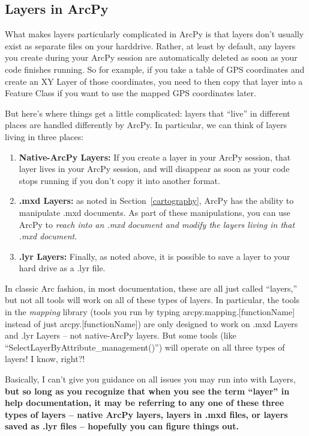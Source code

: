 \documentclass[12pt]{article}
\begin{document}
\subsection*{Layers in ArcPy}

What makes layers particularly complicated in ArcPy is that layers don’t usually exist as separate files on your harddrive. Rather, at least by default, any layers you create during your ArcPy session are automatically deleted as soon as your code finishes running. So for example, if you take a table of GPS coordinates and create an XY Layer of those coordinates, you need to then copy that layer into a Feature Class if you want to use the mapped GPS coordinates later.

But here's where things get a little complicated: layers that ``live'' in different places are handled differently by ArcPy. In particular, we can think of layers living in three places:
\begin{enumerate}
	\item \textbf{Native-ArcPy Layers:} If you create a layer in your ArcPy session, that layer lives in your ArcPy session, and will disappear as soon as your code stops running if you don't copy it into another format. 
	\item \textbf{.mxd Layers:} as noted in Section~\ref{cartography}, ArcPy has the ability to manipulate .mxd documents. As part of these manipulations, you can use ArcPy to \emph{reach into an .mxd document and modify the layers living in that .mxd document}.
	\item \textbf{.lyr Layers:} Finally, as noted above, it is possible to save a layer to your hard drive as a .lyr file. 
\end{enumerate}

In classic Arc fashion, in most documentation, these are all just called ``layers,'' but not all tools will work on all of these types of layers. In particular, the tools in the \emph{mapping} library (tools you run by typing arcpy.mapping.[functionName] instead of just arcpy.[functionName]) are only designed to work on .mxd Layers and .lyr Layers -- not native-ArcPy layers. But some tools (like ``SelectLayerByAttribute\_management()'') will operate on all three types of layers! I know, right?!

Basically, I can't give you guidance on all issues you may run into with Layers, \textbf{but so long as you recognize that when you see the term ``layer'' in help documentation, it may be referring to any one of these three types of layers -- native ArcPy layers, layers in .mxd files, or layers saved as .lyr files -- hopefully you can figure things out.}
\end{document}
